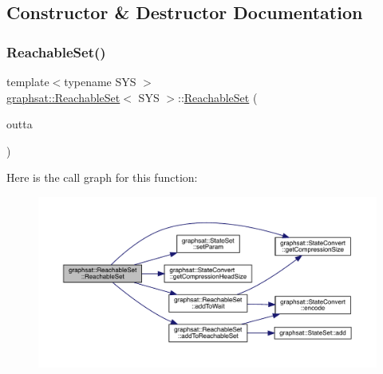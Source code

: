 \subsection{Constructor \& Destructor Documentation}
\mbox{\label{classgraphsat_1_1_reachable_set_a882955085fc1a10913253873b2d9be07}} 
\subsubsection{\texorpdfstring{ReachableSet()}{ReachableSet()}}
{\footnotesize\ttfamily template$<$typename S\+YS $>$ \\
\mbox{\hyperlink{classgraphsat_1_1_reachable_set}{graphsat\+::\+Reachable\+Set}}$<$ S\+YS $>$\+::\mbox{\hyperlink{classgraphsat_1_1_reachable_set}{Reachable\+Set}} (\begin{DoxyParamCaption}\item[{const S\+YS \&}]{outta }\end{DoxyParamCaption})\hspace{0.3cm}{\ttfamily [inline]}}

Here is the call graph for this function\+:
\nopagebreak
\begin{figure}[H]
\begin{center}
\leavevmode
\includegraphics[width=350pt]{classgraphsat_1_1_reachable_set_a882955085fc1a10913253873b2d9be07_cgraph}
\end{center}
\end{figure}
\mbox{\label{classgraphsat_1_1_reachable_set_abb174d0e553c9dc98ee5707fb9d72db5}} 
